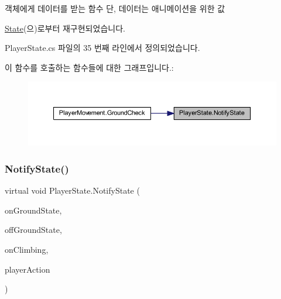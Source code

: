 객체에게 데이터를 받는 함수 단, 데이터는 애니메이션을 위한 값 



\mbox{\hyperlink{class_state_a989a27f9b711812d983344ee381da419}{State}}(으)로부터 재구현되었습니다.



Player\+State.\+cs 파일의 35 번째 라인에서 정의되었습니다.


\begin{DoxyCode}{0}

\end{DoxyCode}
이 함수를 호출하는 함수들에 대한 그래프입니다.\+:\nopagebreak
\begin{figure}[H]
\begin{center}
\leavevmode
\includegraphics[width=350pt]{d6/d23/class_player_state_a59f3f64c24ba1b6e34e34cb23746ecb0_icgraph}
\end{center}
\end{figure}
\mbox{\label{class_player_state_a5fd8b8df346a045643621b312317de72}} 
\subsubsection{\texorpdfstring{NotifyState()}{NotifyState()}\hspace{0.1cm}{\footnotesize\ttfamily [2/2]}}
{\footnotesize\ttfamily virtual void Player\+State.\+Notify\+State (\begin{DoxyParamCaption}\item[{\mbox{\hyperlink{class_state_ab9eb1c1d81f1903b8486d1275e78b68e}{On\+Ground}}}]{on\+Ground\+State,  }\item[{\mbox{\hyperlink{class_state_a7d945e793324c017a973205564cf1a56}{Off\+Ground}}}]{off\+Ground\+State,  }\item[{\mbox{\hyperlink{class_player_state_a16e115e2b4c8d0420119d6ff2fe8b3bc}{On\+Climbing}}}]{on\+Climbing,  }\item[{\mbox{\hyperlink{class_player_state_a2909421d9f22a750c1b0eacfc9bafb3d}{Player\+Action}}}]{player\+Action }\end{DoxyParamCaption})\hspace{0.3cm}{\ttfamily [virtual]}}


